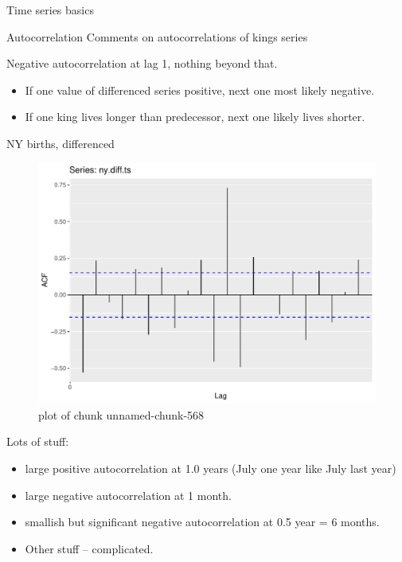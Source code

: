 \documentclass[ignorenonframetext,]{beamer}
\newenvironment{Shaded}{\begin{snugshade}}{\end{snugshade}}
\newcommand{\DataTypeTok}[1]{\textcolor[rgb]{0.13,0.29,0.53}{#1}}
\newcommand{\KeywordTok}[1]{\textcolor[rgb]{0.13,0.29,0.53}{\textbf{#1}}}
\newcommand{\NormalTok}[1]{#1}
\newcommand{\OperatorTok}[1]{\textcolor[rgb]{0.81,0.36,0.00}{\textbf{#1}}}
\newcommand{\StringTok}[1]{\textcolor[rgb]{0.31,0.60,0.02}{#1}}
\providecommand{\tightlist}{%
  \setlength{\itemsep}{0pt}\setlength{\parskip}{0pt}}
\begin{document}
\begin{frame}[fragile]{Time series basics}
\begin{block}{Autocorrelation}
Comments on autocorrelations of kings series

Negative autocorrelation at lag 1, nothing beyond that.

\begin{itemize}
\tightlist
\item
  If one value of differenced series positive, next one most likely
  negative.
\item
  If one king lives longer than predecessor, next one likely lives
  shorter.
\end{itemize}

NY births, differenced

\begin{Shaded}
\end{Shaded}

\begin{figure}
\centering
\includegraphics{figure/unnamed-chunk-568-1.pdf}
\caption{plot of chunk unnamed-chunk-568}
\end{figure}

Lots of stuff:

\begin{itemize}
\tightlist
\item
  large positive autocorrelation at 1.0 years (July one year like July
  last year)
\item
  large negative autocorrelation at 1 month.
\item
  smallish but significant negative autocorrelation at 0.5 year = 6
  months.
\item
  Other stuff -- complicated.
\end{itemize}


\end{block}
\end{frame}
\end{document}
